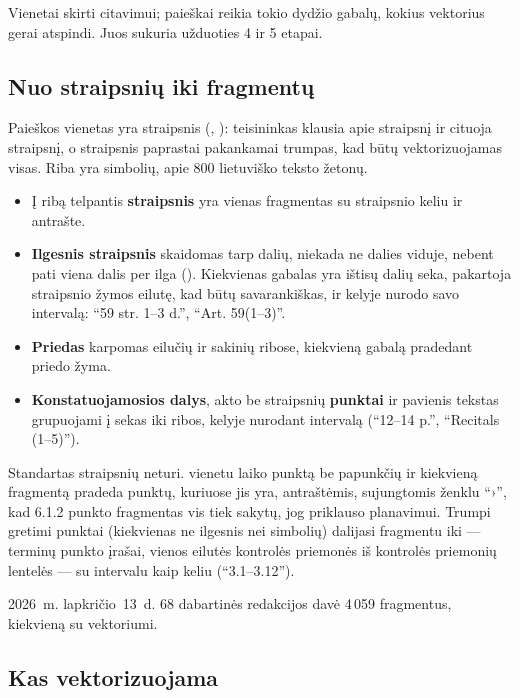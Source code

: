 Vienetai skirti citavimui; paieškai reikia tokio dydžio gabalų, kokius vektorius gerai
atspindi. Juos sukuria užduoties 4 ir 5 etapai.

\subsection{Nuo straipsnių iki fragmentų}\label{sec:corpus:chunking}

Paieškos vienetas yra straipsnis (, ): teisininkas
klausia apie straipsnį ir cituoja straipsnį, o straipsnis paprastai pakankamai trumpas, kad būtų
vektorizuojamas visas. Riba yra  simbolių, apie 800 lietuviško
teksto žetonų.

\begin{itemize}
  \item Į ribą telpantis \textbf{straipsnis} yra vienas fragmentas su straipsnio keliu ir
    antrašte.
  \item \textbf{Ilgesnis straipsnis} skaidomas tarp dalių, niekada ne dalies viduje, nebent
    pati viena dalis per ilga (). Kiekvienas gabalas yra ištisų dalių
    seka, pakartoja straipsnio žymos eilutę, kad būtų savarankiškas, ir kelyje nurodo savo
    intervalą: \enquote{59 str. 1–3 d.}, \enquote{Art. 59(1–3)}.
  \item \textbf{Priedas} karpomas eilučių ir sakinių ribose, kiekvieną gabalą pradedant
    priedo žyma.
  \item \textbf{Konstatuojamosios dalys}, akto be straipsnių \textbf{punktai} ir pavienis
    tekstas grupuojami į sekas iki ribos, kelyje nurodant intervalą (\enquote{12–14 p.},
    \enquote{Recitals (1–5)}).
\end{itemize}

Standartas straipsnių neturi.  vienetu laiko punktą be papunkčių ir
kiekvieną fragmentą pradeda punktų, kuriuose jis yra, antraštėmis, sujungtomis ženklu
\enquote{›}, kad 6.1.2 punkto fragmentas vis tiek sakytų, jog priklauso planavimui. Trumpi
gretimi punktai (kiekvienas ne ilgesnis nei  simbolių) dalijasi
fragmentu iki  --- terminų punkto įrašai, vienos eilutės kontrolės
priemonės iš kontrolės priemonių lentelės --- su intervalu kaip keliu (\enquote{3.1–3.12}).

2026~m. lapkričio~13~d. 68 dabartinės redakcijos davė 4\,059 fragmentus, kiekvieną su vektoriumi.

\subsection{Kas vektorizuojama}\label{sec:corpus:embed}

